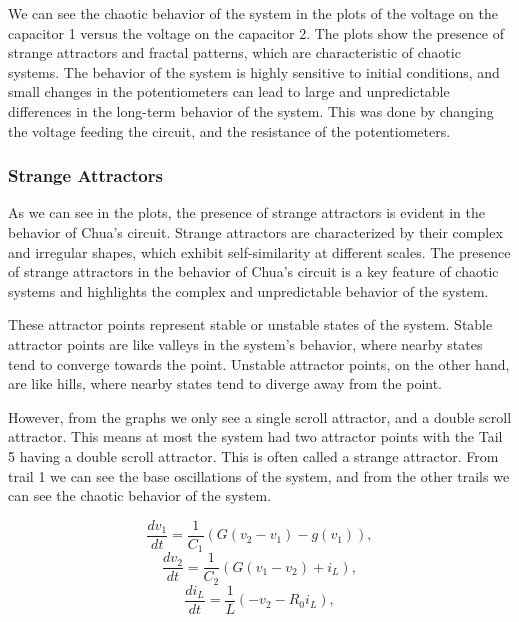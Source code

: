 \documentclass[12pt]{article}
\begin{document}
                We can see the chaotic behavior of the system in the plots of the voltage on the capacitor 1 versus the voltage on the
                capacitor 2. The plots show the presence of strange attractors and fractal patterns, which are characteristic of chaotic
                systems. The behavior of the system is highly sensitive to initial conditions, and small changes in the potentiometers
                can lead to large and unpredictable differences in the long-term behavior of the system. This was done by changing the voltage 
                feeding the circuit, and the resistance of the potentiometers.

                \subsubsection{Strange Attractors}
                As we can see in the plots, the presence of strange attractors is evident in the behavior of Chua's circuit. Strange
                attractors are characterized by their complex and irregular shapes, which exhibit self-similarity at different scales.
                The presence of strange attractors in the behavior of Chua's circuit is a key feature of chaotic systems and highlights
                the complex and unpredictable behavior of the system.
                
                These attractor points represent stable or unstable states of the system. Stable attractor points are like valleys in the
                system's behavior, where nearby states tend to converge towards the point. Unstable attractor points, on the other hand,
                are like hills, where nearby states tend to diverge away from the point.

                However, from the graphs we only see a single scroll attractor, and a double scroll attractor. This means at most the system had 
                two attractor points with the Tail 5 having a double scroll attractor. This is often called a strange attractor. From trail 1 we 
                can see the base oscillations of the system, and from the other trails we can see the chaotic behavior of the system.
                
                \begin{equation}
                        \frac{dv_1}{dt} = \frac{1}{C_1} (G(v_2 - v_1) - g(v_1)),
                        \end{equation}
                        \begin{equation}
                        \frac{dv_2}{dt} = \frac{1}{C_2} (G(v_1 - v_2) + i_L),
                        \end{equation}
                        \begin{equation}
                        \frac{di_L}{dt} = \frac{1}{L} (-v_2 - R_0i_L),
                        \end{equation}
                
\end{document}
